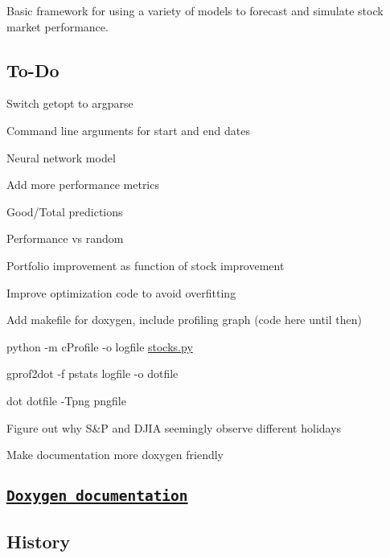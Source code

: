 Basic framework for using a variety of models to forecast and simulate stock market performance.





\subsection*{To-\/\+Do}


\begin{DoxyItemize}
\item Switch getopt to argparse
\item Command line arguments for start and end dates
\item Neural network model
\item Add more performance metrics
\begin{DoxyItemize}
\item Good/\+Total predictions
\item Performance vs random
\item Portfolio improvement as function of stock improvement
\end{DoxyItemize}
\item Improve optimization code to avoid overfitting
\item Add makefile for doxygen, include profiling graph (code here until then)
\begin{DoxyItemize}
\item python -\/m c\+Profile -\/o logfile \hyperlink{stocks_8py}{stocks.\+py}
\item gprof2dot -\/f pstats logfile -\/o dotfile
\item dot dotfile -\/\+Tpng pngfile
\end{DoxyItemize}
\item Figure out why S\&P and D\+J\+IA seemingly observe different holidays
\item Make documentation more doxygen friendly
\end{DoxyItemize}

\subsection*{\href{docs/html/index.html}{\tt Doxygen documentation}}





\subsection*{History}


